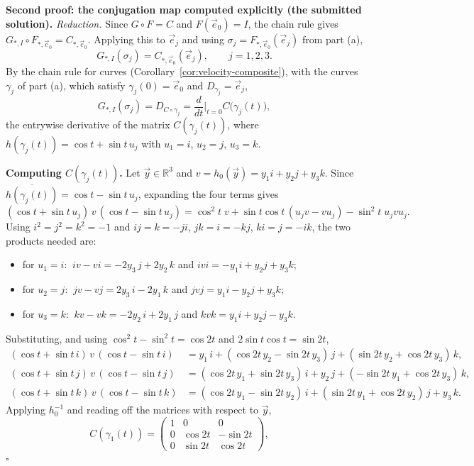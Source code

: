 \documentclass[11pt]{report}
\renewenvironment{proof}[1][Proof]{\noindent\textbf{#1.} }{\hfill$\square$\par\vspace{5pt}}
\begin{document}
\begin{proof}[Second proof: the conjugation map computed explicitly (the submitted solution)]
\emph{Reduction.} Since $G \circ F = C$ and $F(\vec e_0) = I$, the chain rule gives $G_{*,I} \circ F_{*,\vec e_0} = C_{*,\vec e_0}$. Applying this to $\vec e_j$ and using $\sigma_j = F_{*,\vec e_0}(\vec e_j)$ from part (a),
\[
G_{*,I}(\sigma_j) = C_{*,\vec e_0}(\vec e_j), \qquad j = 1, 2, 3.
\]
By the chain rule for curves (Corollary~\ref{cor:velocity-composite}), with the curves $\gamma_j$ of part (a), which satisfy $\gamma_j(0) = \vec e_0$ and $D_{\gamma_j} = \vec e_j$,
\[
G_{*,I}(\sigma_j) = D_{C \circ \gamma_j} = \frac{d}{dt}\Big|_{t=0} C\bigl(\gamma_j(t)\bigr),
\]
the entrywise derivative of the matrix $C(\gamma_j(t))$, where $h(\gamma_j(t)) = \cos t + \sin t\, u_j$ with $u_1 = i$, $u_2 = j$, $u_3 = k$.

\textbf{Computing $C(\gamma_j(t))$.} Let $\vec y \in \mathbb{R}^3$ and $v = h_0(\vec y) = y_1 i + y_2 j + y_3 k$. Since $\overline{h(\gamma_j(t))} = \cos t - \sin t\, u_j$, expanding the four terms gives
\[
(\cos t + \sin t\, u_j)\, v\, (\cos t - \sin t\, u_j) = \cos^2 t\; v + \sin t \cos t\, (u_j v - v u_j) - \sin^2 t\; u_j v u_j .
\]
Using $i^2 = j^2 = k^2 = -1$ and $ij = k = -ji$, $jk = i = -kj$, $ki = j = -ik$, the two products needed are:
\begin{itemize}[topsep=0.3em]
\item for $u_1 = i$: $\ iv - vi = -2y_3\, j + 2y_2\, k$ and $ivi = -y_1 i + y_2 j + y_3 k$;
\item for $u_2 = j$: $\ jv - vj = 2y_3\, i - 2y_1\, k$ and $jvj = y_1 i - y_2 j + y_3 k$;
\item for $u_3 = k$: $\ kv - vk = -2y_2\, i + 2y_1\, j$ and $kvk = y_1 i + y_2 j - y_3 k$.
\end{itemize}
Substituting, and using $\cos^2 t - \sin^2 t = \cos 2t$ and $2 \sin t \cos t = \sin 2t$,
\begin{align*}
(\cos t + \sin t\, i)\, v\, (\cos t - \sin t\, i) &= y_1\, i + (\cos 2t\, y_2 - \sin 2t\, y_3)\, j + (\sin 2t\, y_2 + \cos 2t\, y_3)\, k, \\
(\cos t + \sin t\, j)\, v\, (\cos t - \sin t\, j) &= (\cos 2t\, y_1 + \sin 2t\, y_3)\, i + y_2\, j + (-\sin 2t\, y_1 + \cos 2t\, y_3)\, k, \\
(\cos t + \sin t\, k)\, v\, (\cos t - \sin t\, k) &= (\cos 2t\, y_1 - \sin 2t\, y_2)\, i + (\sin 2t\, y_1 + \cos 2t\, y_2)\, j + y_3\, k .
\end{align*}
Applying $h_0^{-1}$ and reading off the matrices with respect to $\vec y$,
\[
C(\gamma_1(t)) = \begin{pmatrix} 1 & 0 & 0 \\ 0 & \cos 2t & -\sin 2t \\ 0 & \sin 2t & \cos 2t \end{pmatrix}, \quad
\]
\end{proof}
\end{document}
